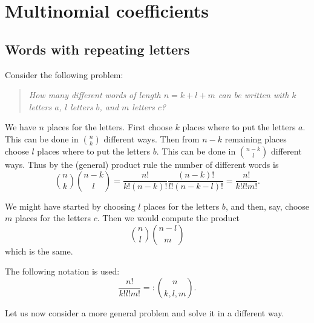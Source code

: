 \section{Multinomial coefficients}
\subsection{Words with repeating letters}
Consider the following problem:
\begin{quote}
\emph{How many different words of length $n=k+l+m$ can be written with $k$ letters $a$, $l$ letters $b$, and $m$ letters $c$?}
\end{quote}

We have $n$ places for the letters.
First choose $k$ places where to put the letters $a$.
This can be done in $\binom{n}{k}$ different ways.
Then from $n-k$ remaining places choose $l$ places where to put the letters $b$.
This can be done in $\binom{n-k}{l}$ different ways.
Thus by the (general) product rule the number of different words is
\[
\binom{n}{k} \binom{n-k}{l} = \frac{n!}{k!(n-k)!} \frac{(n-k)!}{l!(n-k-l)!} = \frac{n!}{k!l!m!}.
\]

We might have started by choosing $l$ places for the letters $b$, and then, say, choose $m$ places for the letters $c$.
Then we would compute the product
\[
\binom{n}{l} \binom{n-l}{m}
\]
which is the same.

The following notation is used:
\[
\frac{n!}{k!l!m!} =: \binom{n}{k, l, m}.
\]

Let us now consider a more general problem and solve it in a different way.
